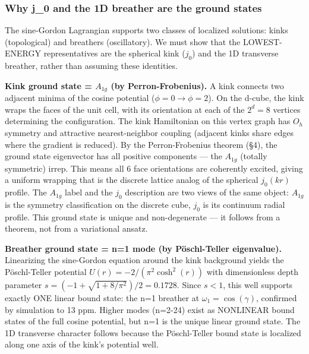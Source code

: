 \documentclass[
]{article}
\begin{document}
\subsubsection{Why j\_0 and the 1D breather are the ground
states}\label{why-j_0-and-the-1d-breather-are-the-ground-states}

The sine-Gordon Lagrangian supports two classes of localized solutions:
kinks (topological) and breathers (oscillatory). We must show that the
LOWEST-ENERGY representatives are the spherical kink (\(j_0\)) and the
1D transverse breather, rather than assuming these identities.

\textbf{Kink ground state = \(A_{1g}\) (by Perron-Frobenius).} A kink
connects two adjacent minima of the cosine potential
(\(\phi = 0 \to \phi = 2\)). On the d-cube, the kink wraps the faces of
the unit cell, with its orientation at each of the \(2^d = 8\) vertices
determining the configuration. The kink Hamiltonian on this vertex graph
has \(O_h\) symmetry and attractive nearest-neighbor coupling (adjacent
kinks share edges where the gradient is reduced). By the
Perron-Frobenius theorem (§4), the ground state eigenvector has all
positive components --- the \(A_{1g}\) (totally symmetric) irrep. This
means all 6 face orientations are coherently excited, giving a uniform
wrapping that is the discrete lattice analog of the spherical
\(j_0(kr)\) profile. The \(A_{1g}\) label and the \(j_0\) description
are two views of the same object: \(A_{1g}\) is the symmetry
classification on the discrete cube, \(j_0\) is its continuum radial
profile. This ground state is unique and non-degenerate --- it follows
from a theorem, not from a variational ansatz.

\textbf{Breather ground state = n=1 mode (by Pöschl-Teller eigenvalue).}
Linearizing the sine-Gordon equation around the kink background yields
the Pöschl-Teller potential \(U(r) = -2/(\pi^2 \cosh^2(r))\) with
dimensionless depth parameter \(s = (-1+\sqrt{1+8/\pi^2})/2 = 0.1728\).
Since \(s < 1\), this well supports exactly ONE linear bound state: the
n=1 breather at \(\omega_1 = \cos(\gamma)\), confirmed by simulation to
13 ppm. Higher modes (n=2-24) exist as NONLINEAR bound states of the
full cosine potential, but n=1 is the unique linear ground state. The 1D
transverse character follows because the Pöschl-Teller bound state is
localized along one axis of the kink's potential well.
\end{document}
